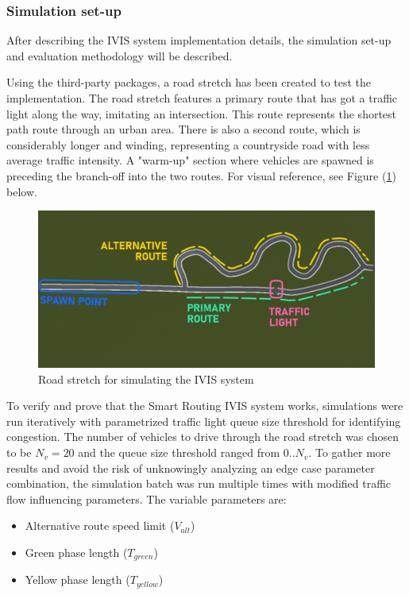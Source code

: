 \documentclass[main.tex]{subfiles}
\begin{document}
\subsubsection{Simulation set-up}

After describing the IVIS system implementation details, the simulation set-up and evaluation 
methodology will be described. 

Using the third-party packages, a road stretch has been created to test the implementation.
The road stretch features a primary route that has got a traffic light along the way, imitating 
an intersection. This route represents the shortest path route through an urban area. 
There is also a second route, which is considerably longer and winding, representing a countryside 
road with less average traffic intensity. A "warm-up" section where vehicles are spawned is
preceding the branch-off into the two routes. For visual reference, see Figure
(\ref{fig-routeMap}) below.

\begin{figure}[htbp]
    \centering
    \includegraphics[width=.9\textwidth]{test-route-map-legend.png}
    \caption{Road stretch for simulating the IVIS system}
    \label{fig-routeMap}
\end{figure}

To verify and prove that the Smart Routing IVIS system works, simulations were run iteratively with 
parametrized traffic light queue size threshold for identifying congestion. The number 
of vehicles to drive through the road stretch was chosen to be $N_v = 20 $ and the queue size 
threshold ranged from $0..N_v$. To gather more results 
and avoid the risk of unknowingly analyzing an edge case parameter combination, the simulation batch 
was run multiple times with modified traffic flow influencing parameters. The variable parameters are:

\begin{itemize}
    \item Alternative route speed limit ($V_{alt}$)
    \item Green phase length ($T_{green}$)
    \item Yellow phase length ($T_{yellow}$)
\end{itemize}
\end{document}
